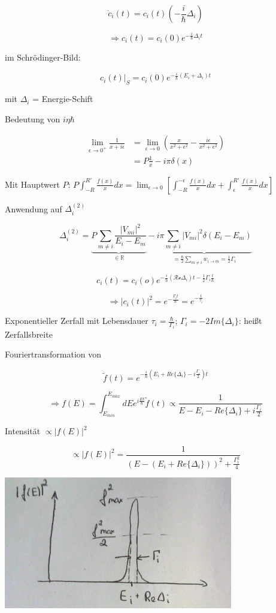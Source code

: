 \[ \dot c_i(t) = c_i(t)(-\frac{i}{\hbar}\Delta_i) \]

\[\boxed{\Rightarrow c_i(t) = c_i(0)e^{-\frac{i}{\hbar}\Delta_i t}}\]

im Schrödinger-Bild:

\[\left.c_i(t)\right|_S=c_i(0)e^{-\frac{i}{\hbar}(E_i+\Delta_i)t}\]

mit \(\Delta_i\) = Energie-Schift

Bedeutung von \(i\eta\hbar\)

\begin{align}
\lim_{\epsilon \to 0^+}\frac{1}{x+i\epsilon} &=\lim_{\epsilon \to 0}\left( \frac{x}{x^2+\epsilon^2}-\frac{i\epsilon}{x^2+\epsilon^2}\right)\\
&= P\frac{1}{x}-i\pi \delta(x)
\end{align}

Mit Hauptwert \(P\):  \(P\int_{-R}^{R'}\frac{f(x)}{x}dx= \lim_{\epsilon \to 0}[\int_{-R}^{-\epsilon}\frac{f(x)}{x}dx +\int_\epsilon^{R'}\frac{f(x)}{x}dx] \)

Anwendung auf \(\Delta_i^{(2)}\)

\[\Delta_i^{(2)}= \underbrace{P\sum_{m\neq i}\frac{|V_{mi}|^2}{E_i-E_m}}_{\in \mathbb R}-\underbrace{i\pi\sum_{m\neq i}|V_{mi}|^2\delta(E_i-E_m)}_{=\frac{\hbar}{2}\sum_{m\neq i}w_{i\to m}=\frac{1}{2}\Gamma_i}\]

\[c_i(t) = c_i(o)e^{-\frac{i}{\hbar}(\mathcal{Re}\Delta_i)t-\frac{1}{2}\Gamma_i\frac{t}{\hbar}}\]

\[\Rightarrow |c_i(t)|^2 = e^{-\frac{\Gamma_i t}{\hbar}}= e^{-\frac{t}{\tau_i}}\]

Exponentieller Zerfall mit Lebensdauer \(\tau_i = \frac{\hbar}{\Gamma_i}\); \(\Gamma_i = -2Im\{\Delta_i\}\): heißt Zerfallsbreite

Fouriertransformation von 

\[\tilde f(t) = e^{-\frac{i}{\hbar}(E_i + Re\{\Delta_i\} - i\frac{\Gamma_i}{2})t}\]

\[\Rightarrow f(E) = \int_{E_{min}}^{E_{max}}dE e^{i\frac{Et}{\hbar}}\tilde f(t) \propto \frac{1}{E-E_i-Re\{\Delta_i\}+i\frac{\Gamma_i}{2}}\]

Intensität \(\propto |f(E)|^2 \)

\[\propto |f(E)|^2=  \frac{1}{(E-(E_i+Re\{\Delta_i\}))^2+\frac{\Gamma_i^2}{4}} \]


\includegraphics[width=0.75\textwidth]{kap03_13.png}

